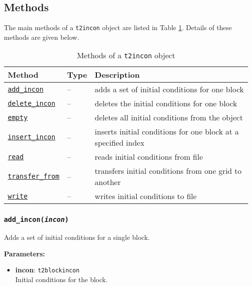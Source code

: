 \subsection{Methods}

The main methods of a \texttt{t2incon} object are listed in Table \ref{tb:t2incon_methods}.  Details of these methods are given below.

\begin{table}
  \begin{center}
    \begin{tabular}{|l|l|p{65mm}|}
      \hline
      \textbf{Method} & \textbf{Type} & \textbf{Description}\\
      \hline
      \hyperref[sec:t2incon:add_incon]{\texttt{add\_incon}} & -- & adds a set of initial conditions for one block\\
      \hyperref[sec:t2incon:delete_incon]{\texttt{delete\_incon}} & -- & deletes the initial conditions for one block\\
      \hyperref[sec:t2incon:empty]{\texttt{empty}} & -- & deletes all initial conditions from the object\\
      \hyperref[sec:t2incon:insert_incon]{\texttt{insert\_incon}} & -- & inserts initial conditions for one block at a specified index\\
      \hyperref[sec:t2incon:read]{\texttt{read}} & -- & reads initial conditions from file\\
      \hyperref[sec:t2incon:transfer_from]{\texttt{transfer\_from}} & -- & transfers initial conditions from one grid to another\\
      \hyperref[sec:t2incon:write]{\texttt{write}} & -- & writes initial conditions to file\\
      \hline
    \end{tabular}
    \caption{Methods of a \texttt{t2incon} object}
    \label{tb:t2incon_methods}
  \end{center}
\end{table}

\subsubsection{\texttt{add\_incon(\emph{incon})}}
\label{sec:t2incon:add_incon}

Adds a set of initial conditions for a single block.

\textbf{Parameters:}
\begin{itemize}
\item \textbf{incon}: \texttt{t2blockincon}\\
  Initial conditions for the block.
\end{itemize}

